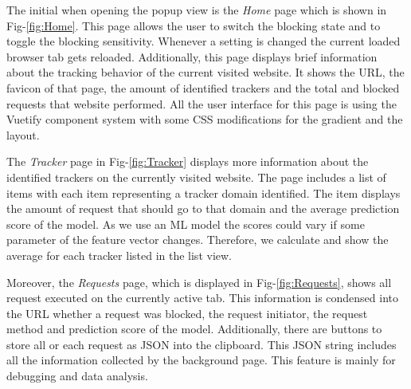 The initial when opening the popup view is the \emph{Home} page which is shown in Fig-\ref{fig:Home}. This page
allows the user to switch the blocking state and to toggle the blocking sensitivity. Whenever a setting is changed the current loaded
browser tab gets reloaded. Additionally, this page displays brief information about the tracking behavior of the current visited website.
It shows the URL, the favicon of that page, the amount of identified trackers and the total and blocked requests that website performed. 
All the user interface for this page is using the Vuetify component system with some CSS modifications for the gradient and the layout.

The \emph{Tracker} page in Fig-\ref{fig:Tracker} displays more information about the identified trackers on the currently
visited website. The page includes a list of items with each item representing a tracker domain identified. The item displays the amount of
request that should go to that domain and the average prediction score of the model. As we use an ML model the scores could vary if some parameter
of the feature vector changes. Therefore, we calculate and show the average for each tracker listed in the list view.

Moreover, the \emph{Requests} page, which is displayed in Fig-\ref{fig:Requests}, shows all request executed on the currently active tab. This information is condensed into the URL 
whether a request was blocked, the request initiator, the request method and prediction score of the model. Additionally, there are buttons to store all or each request as JSON into the clipboard.
This JSON string includes all the information collected by the background page. This feature is mainly for debugging and data analysis.

